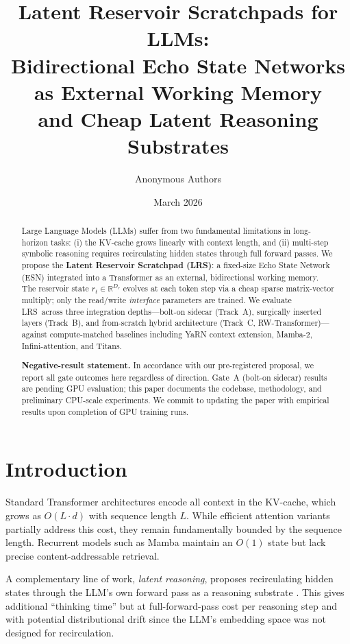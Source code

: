 \documentclass[11pt,a4paper]{article}
\title{%
  \textbf{Latent Reservoir Scratchpads for LLMs:}\\
  \large Bidirectional Echo State Networks as External Working Memory\\
  and Cheap Latent Reasoning Substrates
}
\author{%
  Anonymous Authors
}
\date{March 2026}
\newcommand{\LRS}{\textsc{LRS}}
\theoremstyle{definition}
\begin{document}
\maketitle

\begin{abstract}
Large Language Models (LLMs) suffer from two fundamental limitations in
long-horizon tasks: (i) the KV-cache grows linearly with context length, and
(ii) multi-step symbolic reasoning requires recirculating hidden states through
full forward passes.  We propose the \textbf{Latent Reservoir Scratchpad
(\LRS)}: a fixed-size Echo State Network (ESN) integrated into a Transformer
as an external, bidirectional working memory.  The reservoir state $r_t \in
\mathbb{R}^{D_r}$ evolves at each token step via a cheap sparse
matrix-vector multiply; only the read/write \emph{interface} parameters are
trained.  We evaluate \LRS\ across three integration depths---bolt-on sidecar
(Track~A), surgically inserted layers (Track~B), and from-scratch hybrid
architecture (Track~C, RW-Transformer)---against compute-matched baselines
including YaRN context extension, Mamba-2, Infini-attention, and Titans.

\noindent\textbf{Negative-result statement.} In accordance with our
pre-registered proposal, we report all gate outcomes here regardless of
direction.  Gate~A (bolt-on sidecar) results are pending GPU evaluation; this
paper documents the codebase, methodology, and preliminary CPU-scale
experiments.  We commit to updating the paper with empirical results upon
completion of GPU training runs.
\end{abstract}

\section{Introduction}
\label{sec:intro}

Standard Transformer architectures \citep{vaswani2017attention} encode all
context in the KV-cache, which grows as $O(L \cdot d)$ with sequence length
$L$.  While efficient attention variants
\citep{dao2022flashattention,munkhdalai2024infini} partially address this
cost, they remain fundamentally bounded by the sequence length.  Recurrent
models such as Mamba \citep{gu2023mamba} maintain an $O(1)$ state but lack
precise content-addressable retrieval.

A complementary line of work, \emph{latent reasoning}, proposes recirculating
hidden states through the LLM's own forward pass as a reasoning substrate
\citep{hao2024coconut,geiping2025huginn}.  This gives additional ``thinking
time'' but at full-forward-pass cost per reasoning step and with potential
distributional drift since the LLM's embedding space was not designed for
recirculation.
\end{document}
